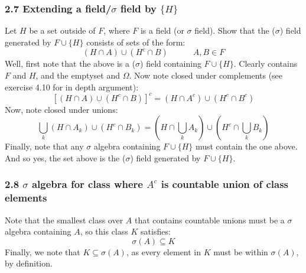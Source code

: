 \documentclass[12pt,a4paper]{article}
\newcommand{\1}[1]{\mathbbm{1}\left\{ #1 \right\}}
\begin{document}
\subsubsection{2.7 Extending a field/$\sigma$ field by $\{H\}$} Let $H$ be a set outside of $F$, where $F$ is a field (or $\sigma$ field). Show that the ($\sigma$) field generated by $F \cup \{H\}$ consists of sets of the form:
$$
	(H \cap A) \cup (H^c \cap B) \quad\quad\quad A,B \in F
$$
Well, first note that the above is a ($\sigma$) field containing $F \cup \{H\}$. Clearly contains $F$ and $H$, and the emptyset and $\Omega$. Now note closed under complements (see exercise 4.10 for in depth argument):
$$
	\left[(H \cap A) \cup (H^c \cap B)\right]^c = (H \cap A^c) \cup (H^c \cap B^c)
$$
Now, note closed under unions:
$$
	\bigcup_k (H \cap A_k) \cup (H^c \cap B_k) =
	(H \cap \bigcup_k A_k) \cup (H^c \cap \bigcup_k B_k)
$$
Finally, note that any $\sigma$ algebra containing $F \cup \{H\}$ must contain the one above. And so yes, the set above is the ($\sigma$) field generated by $F \cup \{H\}$.

\subsubsection{2.8 $\sigma$ algebra for class where $A^c$ is countable union of class elements} Note that the smallest class over $A$ that contains countable unions must be a $\sigma$ algebra containing $A$, so this class $K$ satisfies:
$$
	\sigma(A) \subseteq K
$$
Finally, we note that $K \subseteq \sigma(A)$, as every element in $K$ must be within $\sigma(A)$, by definition.
\end{document}
